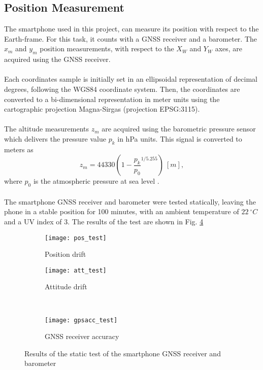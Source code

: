 \subsection{Position Measurement}
The smartphone used in this project, can measure its position with respect to the Earth-frame. For this task, it counts with a GNSS receiver and a barometer.
The $x_{m}$ and $y_{m}$ position measurements, with respect to the $X_W$ and $Y_W$ axes, are acquired using the GNSS receiver. 
\\\\
Each coordinates sample is initially set in an ellipsoidal representation of decimal degrees, following the WGS84 coordinate system. Then, the coordinates are converted to a bi-dimensional representation in meter units using the cartographic projection Magna-Sirgas (projection EPSG:3115).
\\\\
The altitude measurements $z_{m}$ are acquired using the barometric pressure sensor which delivers the pressure value $p_k$ in hPa units. This signal is converted to meters as
\begin{equation}\label{eqn:hbarom}
z_{m} = 44330\left(1-\frac{p_k}{p_{0}}^{1/5.255}\right)\ [m],
\end{equation}
where $p_{0}$ is the atmospheric pressure at sea level \cite{Lauszus2015}.
\\\\
The smartphone GNSS receiver and barometer were tested statically, leaving the phone in a stable position for 100 minutes, with an ambient temperature of $22\ ^{\circ}C$ and a UV index of $3$. The results of the test are shown in Fig. \ref{fig:sensorstest}
\begin{figure}[h]
\begin{subfigure}{.5\linewidth}
\centering
\texttt{[image: pos\_test]}
\caption{Position drift}
\label{fig:pos_test}
\end{subfigure}%
\begin{subfigure}{.5\linewidth}
\centering
\texttt{[image: att\_test]}
\caption{Attitude drift}
\label{fig:att_test}
\end{subfigure}\\[1ex]
\begin{subfigure}{\linewidth}
\centering
\texttt{[image: gpsacc\_test]}
\caption{GNSS receiver accuracy}
\label{fig:gpsacc_test}
\end{subfigure}
\caption{Results of the static test of the smartphone GNSS receiver and barometer}
\label{fig:sensorstest}
\end{figure}
